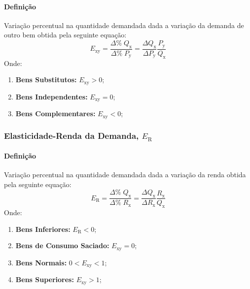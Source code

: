 \documentclass{article}
\begin{document}
            \paragraph{Definição}Variação percentual na quantidade demandada dada a variação da demanda de outro bem obtida pela seguinte equação:
                \begin{equation}
                    \boxed{
                        E_{\text{xy}} = 
                        \frac{\Delta\%\;Q_{\text{x}}}{\Delta\%\;P_{\text{y}}} =
                        \frac{\Delta Q_{\text{x}}}{\Delta P_{\text{y}}} \frac{P_{\text{y}}}{Q_{\text{x}}}
                    }
                \end{equation}
            Onde:
                \begin{enumerate}[noitemsep]
                    \item \textbf{Bens Substitutos:} $E_{\text{xy}} > 0$;

                    \item \textbf{Bens Independentes:} $E_{\text{xy}} = 0$;

                    \item \textbf{Bens Complementares:} $E_{\text{xy}} < 0$;
                \end{enumerate}

        \subsubsection{Elasticidade-Renda da Demanda, $E_{\text{R}}$}
            \paragraph{Definição}Variação percentual na quantidade demandada dada a variação da renda obtida pela seguinte equação:
                \begin{equation}
                    \boxed{
                        E_{\text{R}} = 
                        \frac{\Delta\%\;Q_{\text{x}}}{\Delta\%\;R_{\text{x}}} =
                        \frac{\Delta Q_{\text{x}}}{\Delta R_{\text{x}}} \frac{R_{\text{x}}}{Q_{\text{x}}}
                    }
                \end{equation}
            Onde:
                \begin{enumerate}[noitemsep]
                    \item \textbf{Bens Inferiores:} $E_{\text{R}} < 0$;

                    \item \textbf{Bens de Consumo Saciado:} $E_{\text{xy}} = 0$;

                    \item \textbf{Bens Normais:} $0 < E_{\text{xy}} < 1$;

                    \item \textbf{Bens Superiores:} $E_{\text{xy}} > 1$;
                \end{enumerate}
\end{document}
